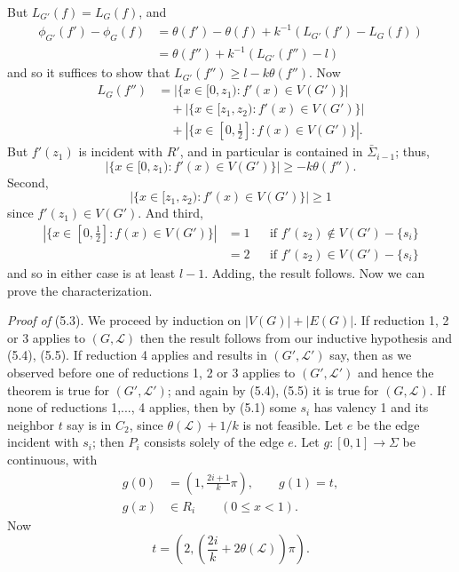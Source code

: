 But $L_{G'}(f) = L_G(f)$, and
\begin{align*}
\phi_{G'}(f') - \phi_G(f) &= \theta(f') - \theta(f) + k^{-1}(L_{G'}(f') - L_G(f)) \\
&= \theta(f'') + k^{-1}(L_{G'}(f'') - l)
\end{align*}
and so it suffices to show that $L_{G'}(f'') \ge l - k\theta(f'')$. Now
\begin{align*}
L_G(f'') &= |\{x \in [0, z_1) : f'(x) \in V(G')\}| \\
&\quad + |\{x \in [z_1, z_2) : f'(x) \in V(G')\}| \\
&\quad + |\{x \in [0, \frac{1}{2}] : f(x) \in V(G')\}|.
\end{align*}
But $f'(z_1)$ is incident with $R'$, and in particular is contained in $\bar{\Sigma}_{i-1}$; thus,
\begin{equation*}
|\{x \in [0, z_1) : f'(x) \in V(G')\}| \ge -k\theta(f'').
\end{equation*}
Second,
\begin{equation*}
|\{x \in [z_1, z_2) : f'(x) \in V(G')\}| \ge 1
\end{equation*}
since $f'(z_1) \in V(G')$. And third,
\begin{align*}
|\{x \in [0, \frac{1}{2}] : f(x) \in V(G')\}| &= 1 && \text{if } f'(z_2) \notin V(G') - \{s_i\} \\
&= 2 && \text{if } f'(z_2) \in V(G') - \{s_i\}
\end{align*}
and so in either case is at least $l - 1$. Adding, the result follows. Now we can prove the characterization.

\textit{Proof of} (5.3). We proceed by induction on $|V(G)| + |E(G)|$. If reduction 1, 2 or 3 applies to $(G, \mathscr{L})$ then the result follows from our inductive hypothesis and (5.4), (5.5). If reduction 4 applies and results in $(G', \mathscr{L}')$ say, then as we observed before one of reductions 1, 2 or 3 applies to $(G', \mathscr{L}')$ and hence the theorem is true for $(G', \mathscr{L}')$; and again by (5.4), (5.5) it is true for $(G, \mathscr{L})$. If none of reductions 1,..., 4 applies, then by (5.1) some $s_i$ has valency 1 and its neighbor $t$ say is in $C_2$, since $\theta(\mathscr{L}) + 1/k$ is not feasible. Let $e$ be the edge incident with $s_i$; then $P_i$ consists solely of the edge $e$. Let $g \colon [0, 1] \to \Sigma$ be continuous, with
\begin{align*}
g(0) &= \left( 1, \frac{2i+1}{k} \pi \right), \qquad g(1) = t, \\
g(x) &\in R_i \qquad (0 \le x < 1).
\end{align*}
Now
\begin{equation*}
t = \left( 2, \left( \frac{2i}{k} + 2\theta(\mathscr{L}) \right) \pi \right).
\end{equation*}
